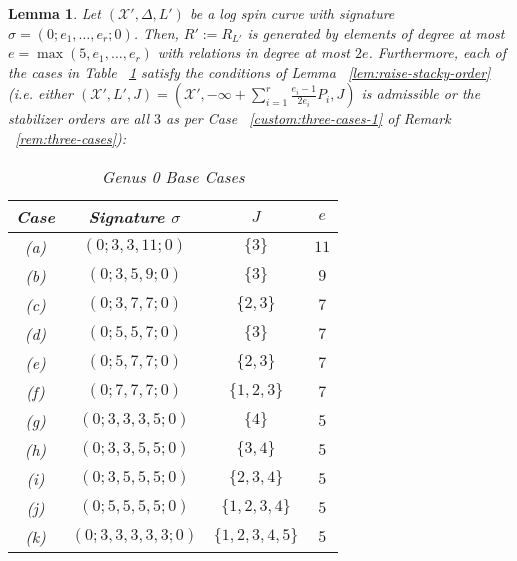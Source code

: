 \documentclass{amsart}
\theoremstyle{plain}
\newtheorem{lem}[thm]{Lemma}
\theoremstyle{definition}
\theoremstyle{remark}
\numberwithin{equation}{section}
\newcommand\sx{\mathscr X}
\newcommand \subhalf[1]{\frac{{#1} - 1}{2{#1}}}
\newcommand{\halfcan}{L}
\DeclareMathOperator{\initial}{in_\prec}
\begin{document}
\begin{lem}
\label{lem:g-0-admissible-cases}
Let $(\sx', \Delta, \halfcan')$ be a log spin curve with signature
$\sigma = (0; e_1, \ldots, e_r; 0)$. Then, $R' := R_{\halfcan'}$ is
generated by elements of degree at most $e = \max(5 , e_1, \ldots,
e_r)$ with relations in degree at most $2e$. Furthermore, each of
the cases in Table ~\ref{table:g-0-base-cases} satisfy the
conditions of Lemma ~\ref{lem:raise-stacky-order} (i.e. either $(\sx',
\halfcan', J) = (\sx', -\infty + \sum_{i = 1}^{r} \subhalf{e_i}
P_i, J)$ is admissible or the stabilizer orders are all $3$ as per
Case ~\ref{custom:three-cases-1} of Remark ~\ref{rem:three-cases}):
 
\rm{
\begin{table}
\begin{tabular}
	{| c || c | c | c |}
	\hline
	Case & Signature $\sigma$ & $J$ & $e$\\
	\hline
	\hline

	(a) & $(0; 3, 3, 11; 0)$ & $\{3\}$ & $11$ \\	\hline

	(b) & $(0; 3, 5, 9; 0)$ & $\{3\}$	& $9$ \\ \hline

	(c) & $(0; 3, 7, 7; 0)$ & $\{2, 3\}$ & $7$ \\ \hline

	(d) & $(0; 5, 5, 7; 0)$ & $\{3\}$	& $7$ \\ \hline
	
	(e) & $(0; 5, 7, 7; 0)$ & $\{2, 3\}$ & $7$ \\ \hline
	
	(f) & $(0; 7, 7, 7; 0)$ & $\{1, 2, 3\}$	& $7$ \\ \hline

	(g) & $(0; 3, 3, 3, 5; 0)$ & $\{4\}$ & $5$ \\ \hline
	
	(h) & $(0; 3, 3, 5, 5; 0)$ & $\{3, 4\}$ & $5$ \\ \hline
	
	(i) & $(0; 3, 5, 5, 5; 0)$ & $\{2, 3, 4\}$ & $5$ \\ \hline
	
	(j) & $(0; 5, 5, 5, 5; 0)$ & $\{1, 2, 3, 4\}$ & $5$ \\ \hline

	(k) &	$(0; 3, 3, 3, 3, 3; 0)$ & $\{1, 2, 3, 4, 5\}$ & $5$ \\ \hline
	\end{tabular}
	\caption{Genus 0 Base Cases}
	\label{table:g-0-base-cases}
\end{table}
}

\end{lem}
\end{document}

